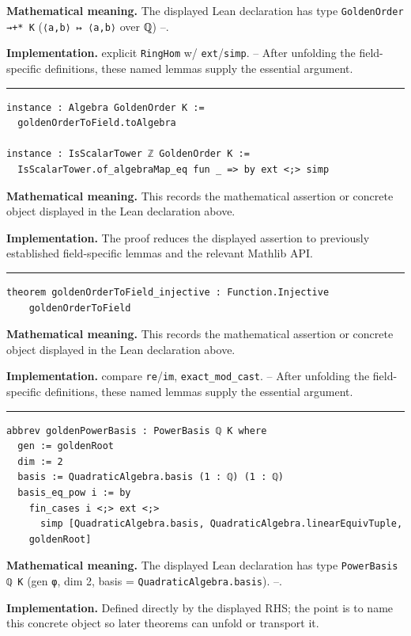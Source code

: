 \documentclass[UTF8,a4paper,11pt,fontset=fandol]{ctexart}
\theoremstyle{definition}
\newcommand{\statementsep}{\par\medskip\hrule\medskip}
\begin{document}
\noindent\textbf{Mathematical meaning.} The displayed Lean declaration has type \texttt{GoldenOrder →+* K} (\texttt{⟨a,b⟩ ↦ ⟨a,b⟩} over ℚ) --.\par
\noindent\textbf{Implementation.} explicit \texttt{RingHom} w/ \texttt{ext}/\texttt{simp}. -- After unfolding the field-specific definitions, these named lemmas supply the essential argument.\par
\statementsep
\begin{verbatim}
instance : Algebra GoldenOrder K :=
  goldenOrderToField.toAlgebra

instance : IsScalarTower ℤ GoldenOrder K :=
  IsScalarTower.of_algebraMap_eq fun _ => by ext <;> simp
\end{verbatim}
\noindent\textbf{Mathematical meaning.} This records the mathematical assertion or concrete object displayed in the Lean declaration above.\par
\noindent\textbf{Implementation.} The proof reduces the displayed assertion to previously established field-specific lemmas and the relevant Mathlib API.\par
\statementsep
\begin{verbatim}
theorem goldenOrderToField_injective : Function.Injective
    goldenOrderToField
\end{verbatim}
\noindent\textbf{Mathematical meaning.} This records the mathematical assertion or concrete object displayed in the Lean declaration above.\par
\noindent\textbf{Implementation.} compare \texttt{re}/\texttt{im}, \texttt{exact\_\allowbreak{}mod\_\allowbreak{}cast}. -- After unfolding the field-specific definitions, these named lemmas supply the essential argument.\par
\statementsep
\begin{verbatim}
abbrev goldenPowerBasis : PowerBasis ℚ K where
  gen := goldenRoot
  dim := 2
  basis := QuadraticAlgebra.basis (1 : ℚ) (1 : ℚ)
  basis_eq_pow i := by
    fin_cases i <;> ext <;>
      simp [QuadraticAlgebra.basis, QuadraticAlgebra.linearEquivTuple,
    goldenRoot]
\end{verbatim}
\noindent\textbf{Mathematical meaning.} The displayed Lean declaration has type \texttt{PowerBasis ℚ K} (gen \texttt{φ}, dim 2, basis = \texttt{QuadraticAlgebra.\allowbreak{}basis}). --.\par
\noindent\textbf{Implementation.} Defined directly by the displayed RHS; the point is to name this concrete object so later theorems can unfold or transport it.\par
\end{document}
